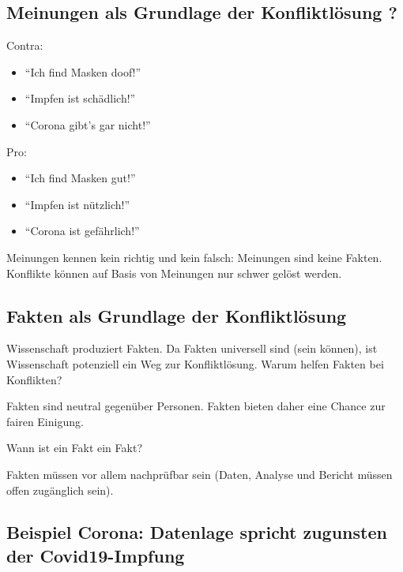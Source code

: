 \documentclass[
  a4paper,
  DIV=11]{scrreprt}
\providecommand{\tightlist}{%
  \setlength{\itemsep}{0pt}\setlength{\parskip}{0pt}}\usepackage{longtable,booktabs,array}
\theoremstyle{definition}
\theoremstyle{remark}
\begin{document}
\hypertarget{meinungen-als-grundlage-der-konfliktluxf6sung}{%
\subsection{Meinungen als Grundlage der Konfliktlösung
?}\label{meinungen-als-grundlage-der-konfliktluxf6sung}}

Contra:

\begin{itemize}
\tightlist
\item
  ``Ich find Masken doof!''
\item
  ``Impfen ist schädlich!''
\item
  ``Corona gibt's gar nicht!''
\end{itemize}

Pro:

\begin{itemize}
\tightlist
\item
  ``Ich find Masken gut!''
\item
  ``Impfen ist nützlich!''
\item
  ``Corona ist gefährlich!''
\end{itemize}

Meinungen kennen kein richtig und kein falsch: Meinungen sind keine
Fakten. Konflikte können auf Basis von Meinungen nur schwer gelöst
werden.

\hypertarget{fakten-als-grundlage-der-konfliktluxf6sung}{%
\subsection{Fakten als Grundlage der
Konfliktlösung}\label{fakten-als-grundlage-der-konfliktluxf6sung}}

Wissenschaft produziert Fakten. Da Fakten universell sind (sein können),
ist Wissenschaft potenziell ein Weg zur Konfliktlösung. Warum helfen
Fakten bei Konflikten?

Fakten sind neutral gegenüber Personen. Fakten bieten daher eine Chance
zur fairen Einigung.

Wann ist ein Fakt ein Fakt?

Fakten müssen vor allem nachprüfbar sein (Daten, Analyse und Bericht
müssen offen zugänglich sein).

\hypertarget{beispiel-corona-datenlage-spricht-zugunsten-der-covid19-impfung}{%
\subsection{Beispiel Corona: Datenlage spricht zugunsten der
Covid19-Impfung}\label{beispiel-corona-datenlage-spricht-zugunsten-der-covid19-impfung}}
\end{document}
